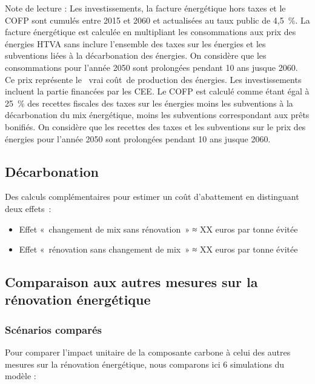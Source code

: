 \documentclass[10.5pt,a4paper]{article}
\begin{document}
{\begin{table}[h]
\footnotesize{Note de lecture : Les investissements, la facture énergétique hors taxes  et le COFP sont cumulés entre 2015 et 2060 et actualisées au taux public de 4,5~\%.  La facture énergétique est calculée en multipliant les consommations aux prix des énergies HTVA  sans inclure l'ensemble des taxes sur les énergies et les subventions liées à la décarbonation des énergies. On considère que les consommations pour l'année 2050 sont prolongées pendant 10 ans jusque 2060. Ce prix représente le \og~vrai coût~\fg de production des énergies. Les investissements incluent la partie financées par les CEE. Le COFP est calculé comme étant égal à 25~\% des recettes fiscales des taxes sur les énergies moins les subventions à la décarbonation du mix énergétique, moins les subventions correspondant aux prêts bonifiés. On considère que les recettes des taxes et les subventions sur le prix des énergies pour l'année 2050 sont prolongées pendant 10 ans jusque 2060.}

\end{table}


\clearpage
\newpage 

\subsection{Décarbonation}

Des calculs complémentaires pour estimer un coût d’abattement en distinguant deux effets :  
\begin{itemize}
	\item Effet « changement de mix sans rénovation » ≈  XX euros par tonne évitée
	\item Effet « rénovation sans changement de mix »  ≈  XX euros par tonne évitée 
\end{itemize}


\subsection{Comparaison aux autres mesures sur la rénovation énergétique}

\subsubsection{Scénarios comparés}

Pour comparer l'impact unitaire de la composante carbone à celui des autres mesures sur la rénovation énergétique, nous comparons ici 6 simulations du modèle :

}
\end{document}
